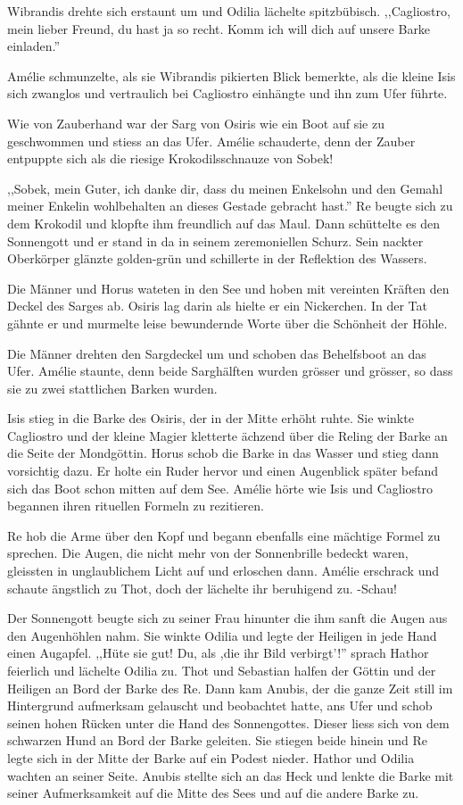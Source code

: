 Wibrandis drehte sich erstaunt um und Odilia lächelte spitzbübisch. ,,Cagliostro, mein lieber Freund, du hast ja so recht. Komm ich will dich auf unsere Barke einladen.''

Amélie schmunzelte, als sie Wibrandis pikierten Blick bemerkte, als die kleine Isis sich zwanglos und vertraulich bei Cagliostro einhängte und ihn zum Ufer führte.

Wie von Zauberhand war der Sarg von Osiris wie ein Boot auf sie zu geschwommen und stiess an das Ufer. Amélie schauderte, denn der Zauber entpuppte sich als die riesige Krokodilsschnauze von Sobek!

,,Sobek, mein Guter, ich danke dir, dass du meinen Enkelsohn und den Gemahl meiner Enkelin wohlbehalten an dieses Gestade gebracht hast.'' Re beugte sich zu dem Krokodil und klopfte ihm freundlich auf das Maul. Dann schüttelte es den Sonnengott und er stand in da in seinem zeremoniellen Schurz. Sein nackter Oberkörper glänzte golden-grün und schillerte in der Reflektion des Wassers.

Die Männer und Horus wateten in den See und hoben mit vereinten Kräften den Deckel des Sarges ab. Osiris lag darin als hielte er ein Nickerchen. In der Tat gähnte er und murmelte leise bewundernde Worte über die Schönheit der Höhle.

Die Männer drehten den Sargdeckel um und schoben das Behelfsboot an das Ufer. Amélie staunte, denn beide Sarghälften wurden grösser und grösser, so dass sie zu zwei stattlichen Barken wurden. 

Isis stieg in die Barke des Osiris, der in der Mitte erhöht ruhte. Sie winkte Cagliostro und der kleine Magier kletterte ächzend über die Reling der Barke an die Seite der Mondgöttin. Horus schob die Barke in das Wasser und stieg dann vorsichtig dazu. Er holte ein Ruder hervor und einen Augenblick später befand sich das Boot schon mitten auf dem See. Amélie hörte wie Isis und Cagliostro begannen ihren rituellen Formeln zu rezitieren.

Re hob die Arme über den Kopf und begann ebenfalls eine mächtige Formel zu sprechen. Die Augen, die nicht mehr von der Sonnenbrille bedeckt waren, gleissten in unglaublichem Licht auf und erloschen dann. Amélie erschrack und schaute ängstlich zu Thot, doch der lächelte ihr beruhigend zu. -Schau!

Der Sonnengott beugte sich zu seiner Frau hinunter die ihm sanft die Augen aus den Augenhöhlen nahm. Sie winkte Odilia und legte der Heiligen in jede Hand einen Augapfel. ,,Hüte sie gut! Du, als ,die ihr Bild verbirgt'!'' sprach Hathor feierlich und lächelte Odilia zu. Thot und Sebastian halfen der Göttin und der Heiligen an Bord der Barke des Re. Dann kam Anubis, der die ganze Zeit still im Hintergrund aufmerksam gelauscht und beobachtet hatte, ans Ufer und schob seinen hohen Rücken unter die Hand des Sonnengottes. Dieser liess sich von dem schwarzen Hund an Bord der Barke geleiten. Sie stiegen beide hinein und Re legte sich in der Mitte der Barke auf ein Podest nieder. Hathor und Odilia wachten an seiner Seite. Anubis stellte sich an das Heck und lenkte die Barke mit seiner Aufmerksamkeit auf die Mitte des Sees und auf die andere Barke zu.

